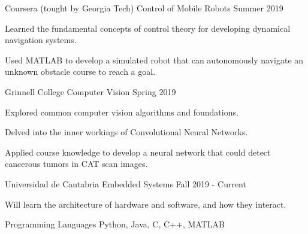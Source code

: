 \documentclass[12pt, a4paper]{awesome-cv}
\begin{document}
\begin{cventries}

    \cventry
	{Coursera (tought by Georgia Tech)}
	{Control of Mobile Robots}
	{}
	{Summer 2019}
	{
	  \begin{cvitems}
		\item{Learned the fundamental concepts of control theory for developing dynamical navigation systems.}
		\item{Used MATLAB to develop a simulated robot that can autonomously navigate an unknown obstacle course to reach a goal.}
	  \end{cvitems}
	}

    \cventry
	{Grinnell College}
	{Computer Vision}
	{}
	{Spring 2019}
	{
	  \begin{cvitems}
		\item{Explored common computer vision algorithms and foundations.}
		\item{Delved into the inner workings of Convolutional Neural Networks.}
		\item{Applied course knowledge to develop a neural network that could detect cancerous tumors in CAT scan images.}
	  \end{cvitems}
	}

    \cventry
	{Universidad de Cantabria}
	{Embedded Systems}
	{}
	{Fall 2019 - Current}
	{
	  \begin{cvitems}
		\item{Will learn the architecture of hardware and software, and how they interact.}
	  \end{cvitems}
	}

\end{cventries}

\begin{cvskills}
  \cvskill
    {Programming Languages} 
    {Python, Java, C, C++, MATLAB} 

\end{cvskills}
\end{document}
